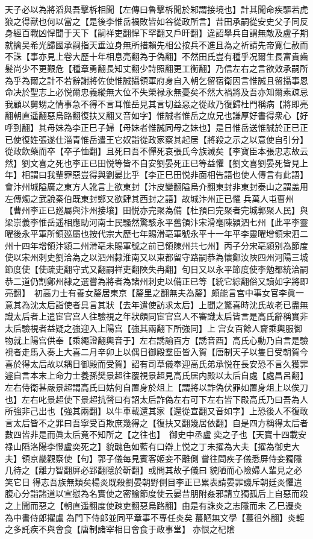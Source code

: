 天子必以為將滔與吾擊柝相聞【左傳曰魯擊柝聞於邾謂接境也】計其聞命疾驅若虎狼之得獸也何以當之【是後李惟岳禍敗皆如谷從政所言】昔田承嗣從安史父子同反身經百戰凶悍聞于天下【嗣祥吏翻悍下罕翻又戶旰翻】違詔舉兵自謂無敵及盧子期就擒吴希光歸國承嗣指天垂泣身無所措賴先相公按兵不進且為之祈請先帝寛仁赦而不誅【事亦見上卷大歷十年相息亮翻為于偽翻】不然田氏豈有種乎况爾生長富貴齒髪尚少不更艱危【種章勇翻長知丈翻少詩照翻更工衡翻】乃信左右之言欲效承嗣所為乎為爾之計不若辭謝將佐使惟誠攝領軍府身自入朝乞留宿衛因言惟誠且留攝事恩命决於聖志上必悦爾忠義縱無大位不失榮禄永無憂矣不然大禍將及吾亦知爾素疎忌我顧以舅甥之情事急不得不言耳惟岳見其言切益惡之從政乃復歸杜門稱病【將即亮翻朝直遥翻惡烏路翻復扶又翻又音如字】惟誠者惟岳之庶兄也謙厚好書得衆心【好呼到翻】其母妹為李正巳子婦【母妹者惟誠同母之妹也】是日惟岳送惟誠於正已正已使復姓張遂仕淄青惟岳遣王它奴詣從政家察其起居【將殺之示之以意使自引分】從政飲藥而卒【卒子恤翻】且死曰吾不憚死哀張氏今族滅矣【李寶臣本張忠志故云然】劉文喜之死也李正已田悦等皆不自安劉晏死正已等益懼【劉文喜劉晏死皆見上年】相謂曰我輩罪惡豈得與劉晏比乎【李正巳田悦非面相告語也使人傳言有此語】會汴州城隘廣之東方人訛言上欲東封【汴皮變翻隘烏介翻東封非東封泰山之謂盖用左傳燭之武說秦伯既東封鄭又欲肆其西封之語】故城汴州正已懼兵萬人屯曹州【曹州李正已廵屬與汴州接壤】田悦亦完聚為備【杜預曰完聚者完城郭聚人民】與梁崇義李惟岳遥相應助河南士民騷然驚駭永平舊領汴宋滑亳陳潁泗七州【此平李靈曜後永平軍所領廵屬也按代宗大歷七年賜滑亳軍號永平十一年平李靈曜增領宋泗二州十四年增領汴潁二州滑亳未賜軍號之前已領陳州共七州】丙子分宋亳潁别為節度使以宋州刺史劉洽為之以泗州隸淮南又以東都留守路嗣恭為懷鄭汝陜四州河陽三城節度使【使疏吏翻守式又翻嗣祥吏翻陜失冉翻】旬日又以永平節度使李勉都統洽嗣恭二道仍割鄭州隸之選嘗為將者為諸州刺史以備正已等【統它綜翻俗又讀如字將即亮翻】　初高力士有養女嫠居東京【嫠里之翻無夫為嫠】頗能言宫中事女官李眞一意其為沈太后詣使者具言其狀【去年遣使訪求太后】上聞之驚喜時沈氏故老已盡無識太后者上遣宦官宫人往驗視之年狀頗同宦官宫人不審識太后皆言是高氏辭稱實非太后驗視者益疑之強迎入上陽宫【強其兩翻下所強同】上宫女百餘人齎乘輿服御物就上陽宫供奉【乘繩證翻輿音于】左右誘諭百方【誘音酉】高氏心動乃自言是驗視者走馬入奏上大喜二月辛卯上以偶日御殿羣臣皆入賀【唐制天子以隻日受朝賀今喜於得太后故以耦日御殿而受賀】詔有司草儀奉迎高氏弟承悦在長安恐不言久獲罪遽自言本末上命力士養孫樊景超往覆視景超見高氏居内殿以太后自處【處昌呂翻】左右侍衛甚嚴景超謂高氏曰姑何自置身於俎上【謂將以詐偽伏罪如置身俎上以俟刀也】左右叱景超使下景超抗聲曰有詔太后詐偽左右可下左右皆下殿高氏乃曰吾為人所強非己出也【強其兩翻】以牛車載還其家【還從宣翻又音如字】上恐後人不復敢言太后皆不之罪曰吾寧受百欺庶幾得之【復扶又翻幾居依翻】自是四方稱得太后者數四皆非是而眞太后竟不知所之【之往也】　御史中丞盧奕之子也【天寶十四載安禄山䧟洛陽李憕盧奕死之】貌醜色如藍有口辯上悦之丁未擢為大夫【擢為御史大夫】領京畿觀察使【句】郭子儀每見賓客姬妾不離側嘗往問疾子儀悉屏侍妾獨隱几待之【離力智翻屏必郢翻隱於靳翻】或問其故子儀曰貌陋而心險婦人輩見之必笑它日得志吾族無類矣楊炎既殺劉晏朝野側目李正已累表請晏罪譏斥朝廷炎懼遣腹心分詣諸道以宣慰為名實使之密諭節度使云晏昔朋附姦邪請立獨孤后上自惡而殺之上聞而惡之【朝直遥翻度使疎吏翻惡烏路翻】由是有誅炎之志隱而未乙巳遷炎為中書侍郎擢盧為門下侍郎並同平章事不專任炎矣蕞陋無文學【蕞徂外翻】炎輕之多託疾不與會食【唐制諸宰相日會食于政事堂】亦恨之杞隂